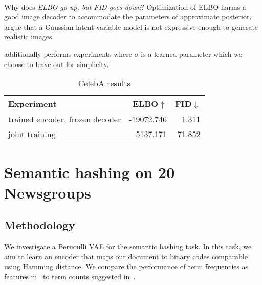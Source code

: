 \paragraph{} Why does \textit{ELBO go up, but FID goes down}? Optimization of ELBO harms a good image decoder to accommodate the parameters of approximate posterior. \cite{shekhovtsov2022vae} argue that a Gaussian latent variable model is not expressive enough to generate realistic images.

\cite{shekhovtsov2022vae} additionally performs experiments where $\sigma$ is a learned parameter which we choose to leave out for simplicity.

\begin{table}[H]
\caption{CelebA results}
\label{tab:gan}
\centering
\begin{tabular}{lrr}
\hline
Experiment & ELBO$\uparrow$ & FID$\downarrow$ \\
\hline
trained encoder, frozen decoder & -19072.746 & 1.311\\ 
joint training & 5137.171 & 71.852\\
\hline
\end{tabular}
\end{table}


\section{Semantic hashing on 20 Newsgroups}\label{sec:bern}

\subsection{Methodology}

We investigate a Bernoulli VAE for the semantic hashing task. In this task, we aim to learn an encoder that maps our document to binary codes comparable using Hamming distance. We compare the performance of term frequencies as features in~\cite{Chaidaroon2017VariationalDS} to term counts suggested in~\cite{shekhovtsov2022vae}.

